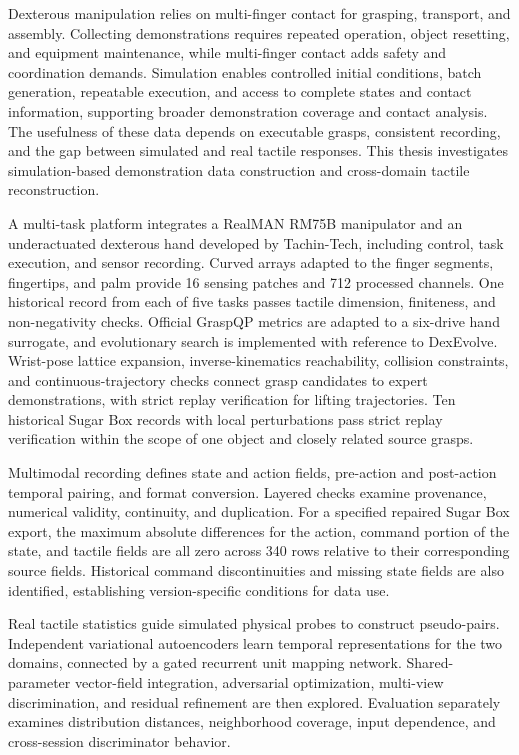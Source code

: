 \begin{eabstract}
Dexterous manipulation relies on multi-finger contact for grasping, transport, and assembly. Collecting demonstrations requires repeated operation, object resetting, and equipment maintenance, while multi-finger contact adds safety and coordination demands. Simulation enables controlled initial conditions, batch generation, repeatable execution, and access to complete states and contact information, supporting broader demonstration coverage and contact analysis. The usefulness of these data depends on executable grasps, consistent recording, and the gap between simulated and real tactile responses. This thesis investigates simulation-based demonstration data construction and cross-domain tactile reconstruction.

A multi-task platform integrates a RealMAN RM75B manipulator and an underactuated dexterous hand developed by Tachin-Tech, including control, task execution, and sensor recording. Curved arrays adapted to the finger segments, fingertips, and palm provide 16 sensing patches and 712 processed channels. One historical record from each of five tasks passes tactile dimension, finiteness, and non-negativity checks. Official GraspQP metrics are adapted to a six-drive hand surrogate, and evolutionary search is implemented with reference to DexEvolve. Wrist-pose lattice expansion, inverse-kinematics reachability, collision constraints, and continuous-trajectory checks connect grasp candidates to expert demonstrations, with strict replay verification for lifting trajectories. Ten historical Sugar Box records with local perturbations pass strict replay verification within the scope of one object and closely related source grasps.

Multimodal recording defines state and action fields, pre-action and post-action temporal pairing, and format conversion. Layered checks examine provenance, numerical validity, continuity, and duplication. For a specified repaired Sugar Box export, the maximum absolute differences for the action, command portion of the state, and tactile fields are all zero across 340 rows relative to their corresponding source fields. Historical command discontinuities and missing state fields are also identified, establishing version-specific conditions for data use.

Real tactile statistics guide simulated physical probes to construct pseudo-pairs. Independent variational autoencoders learn temporal representations for the two domains, connected by a gated recurrent unit mapping network. Shared-parameter vector-field integration, adversarial optimization, multi-view discrimination, and residual refinement are then explored. Evaluation separately examines distribution distances, neighborhood coverage, input dependence, and cross-session discriminator behavior.


\end{eabstract}
